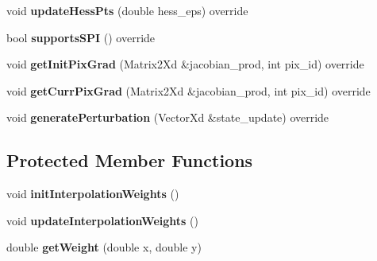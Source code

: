 \begin{DoxyCompactItemize}
\item 
\hypertarget{classSpline_a2cec43353aab14152c15fbbac3839793}{void {\bfseries update\-Hess\-Pts} (double hess\-\_\-eps) override}\label{classSpline_a2cec43353aab14152c15fbbac3839793}

\item 
\hypertarget{classSpline_a7a21da6d4dcbe3b23ea25f4ed6b72805}{bool {\bfseries supports\-S\-P\-I} () override}\label{classSpline_a7a21da6d4dcbe3b23ea25f4ed6b72805}

\item 
\hypertarget{classSpline_ae8ccc794a8d024048de0c20a9f69d0bc}{void {\bfseries get\-Init\-Pix\-Grad} (Matrix2\-Xd \&jacobian\-\_\-prod, int pix\-\_\-id) override}\label{classSpline_ae8ccc794a8d024048de0c20a9f69d0bc}

\item 
\hypertarget{classSpline_aafadbf826535e460c9b293f9d21bfcd3}{void {\bfseries get\-Curr\-Pix\-Grad} (Matrix2\-Xd \&jacobian\-\_\-prod, int pix\-\_\-id) override}\label{classSpline_aafadbf826535e460c9b293f9d21bfcd3}

\item 
\hypertarget{classSpline_a24d3c5d2a09738cad9ea270d1794324b}{void {\bfseries generate\-Perturbation} (Vector\-Xd \&state\-\_\-update) override}\label{classSpline_a24d3c5d2a09738cad9ea270d1794324b}

\end{DoxyCompactItemize}
\subsection*{Protected Member Functions}
\begin{DoxyCompactItemize}
\item 
\hypertarget{classSpline_a83447b8b71ac9222f9334a7877da7792}{void {\bfseries init\-Interpolation\-Weights} ()}\label{classSpline_a83447b8b71ac9222f9334a7877da7792}

\item 
\hypertarget{classSpline_a3b836e0c986e7a280f8bf10b4a2e2548}{void {\bfseries update\-Interpolation\-Weights} ()}\label{classSpline_a3b836e0c986e7a280f8bf10b4a2e2548}

\item 
\hypertarget{classSpline_ad6e320c02517fd2a2540688307ae7021}{double {\bfseries get\-Weight} (double x, double y)}\label{classSpline_ad6e320c02517fd2a2540688307ae7021}

\end{DoxyCompactItemize}
